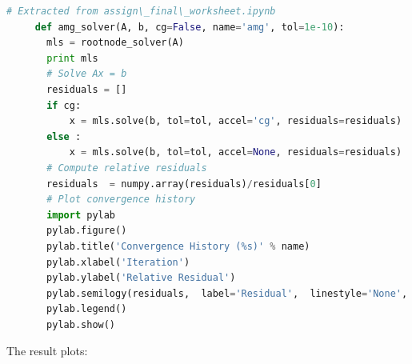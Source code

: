 \documentclass[a4paper,12pt]{article}
\begin{document}
\begin{lstlisting}[language=Python, caption={Solving Laplace equation using pyamg}, label={lst:border}]
     # Extracted from assign\_final\_worksheet.ipynb
     def amg_solver(A, b, cg=False, name='amg', tol=1e-10):
       mls = rootnode_solver(A)
       print mls
       # Solve Ax = b
       residuals = []
       if cg:
           x = mls.solve(b, tol=tol, accel='cg', residuals=residuals)
       else :
           x = mls.solve(b, tol=tol, accel=None, residuals=residuals)
       # Compute relative residuals
       residuals  = numpy.array(residuals)/residuals[0]  
       # Plot convergence history
       import pylab
       pylab.figure()
       pylab.title('Convergence History (%s)' % name)
       pylab.xlabel('Iteration')
       pylab.ylabel('Relative Residual')
       pylab.semilogy(residuals,  label='Residual',  linestyle='None', marker='.')
       pylab.legend()
       pylab.show()
\end{lstlisting}
\pagebreak
The result plots:
\end{document}
